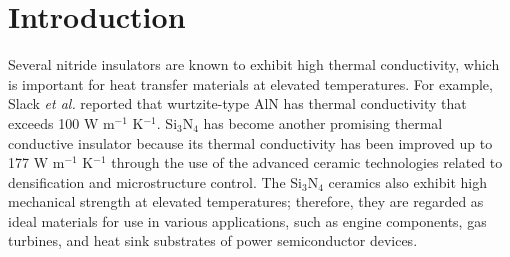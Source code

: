 \documentclass[twocolumn,amsmath,amssymb,a4paper,prb,superscriptaddress,floatfix]{revtex4-1}
\begin{document}
\section{Introduction}
Several nitride insulators are known to exhibit high thermal conductivity, which
is important for heat transfer materials at elevated temperatures. For example,
Slack {\it et al.}\cite{slack} reported that wurtzite-type AlN has thermal
conductivity that exceeds 100 W m$^{-1}$ K$^{-1}$. Si$_3$N$_4$ has become another
promising thermal conductive insulator because its thermal conductivity has been
improved up to 177 W m$^{-1}$ K$^{-1}$ through the use of the advanced ceramic technologies
related to densification and microstructure
control.\cite{zhou,hirao-rev,watari,hirosaki} The Si$_3$N$_4$ ceramics
also exhibit high mechanical strength at elevated temperatures; therefore, they are
regarded as ideal materials for use in various applications, such as engine
components, gas turbines, and heat sink substrates of power semiconductor
devices.
\end{document}
